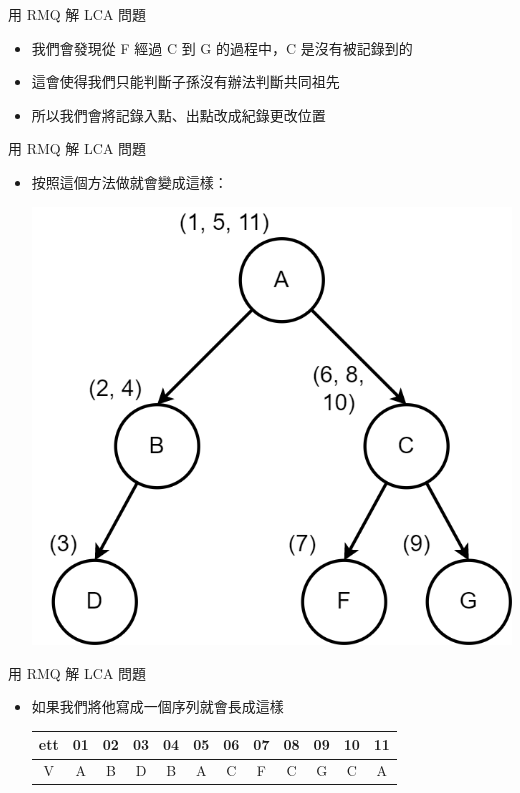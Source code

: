 \documentclass[aspectratio=169]{beamer}
\begin{document}
    \begin{frame}{用 RMQ 解 LCA 問題}
        \begin{itemize}
            \item<1-> 我們會發現從 F 經過 C 到 G 的過程中，C 是沒有被記錄到的
            \item<2-> 這會使得我們只能判斷子孫沒有辦法判斷共同祖先
            \item<3-> 所以我們會將記錄入點、出點改成紀錄更改位置
        \end{itemize}
    \end{frame}

    \begin{frame}{用 RMQ 解 LCA 問題}
        \begin{itemize}
            \item 按照這個方法做就會變成這樣：
            \begin{center}
                \includegraphics[height=0.7\textheight]{src/ett_2.png}
            \end{center}
        \end{itemize}
    \end{frame}

    \begin{frame}{用 RMQ 解 LCA 問題}
        \begin{itemize}
            \item 如果我們將他寫成一個序列就會長成這樣
            \begin{center}
                \begin{tabular}{c|c|c|c|c|c|c|c|c|c|c|c}
                    ett & 01 & 02 & 03 & 04 & 05 & 06 & 07 & 08 & 09 & 10 & 11\\
                    \hline
                    V & A & B & D & B & A & C & F & C & G & C & A
                \end{tabular}
            \end{center}
        \end{itemize}
    \end{frame}
\end{document}
